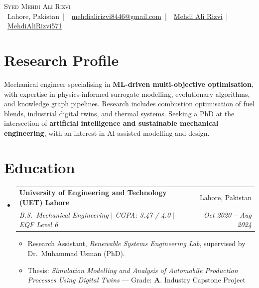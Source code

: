 \documentclass[letterpaper,11pt]{article}
\makeatletter
\newcommand{\resumeItem}[1]{
  \item\small{#1 \vspace{-2pt}}
}
\newcommand{\resumeSubheading}[4]{
  \vspace{-2pt}\item
    \begin{tabular*}{0.97\textwidth}[t]{l@{\extracolsep{\fill}}r}
      \textbf{#1} & #2 \\
      \textit{\small#3} & \textit{\small #4} \\
    \end{tabular*}\vspace{-7pt}
}
\newcommand{\resumeSubHeadingListStart}{\begin{itemize}[leftmargin=0.15in, label={}]}
\newcommand{\resumeSubHeadingListEnd}{\end{itemize}}
\newcommand{\resumeItemListStart}{\begin{itemize}}
\newcommand{\resumeItemListEnd}{\end{itemize}\vspace{-5pt}}
\makeatother
\begin{document}
\begin{center}
    {\Huge \scshape Syed Mehdi Ali Rizvi} \\ \vspace{4pt}
    \small
    \faMapMarkerAlt\ Lahore, Pakistan \,|\,  
    \faEnvelope\ \href{mailto:mehdialirizvi8446@gmail.com}{mehdialirizvi8446@gmail.com} \,|\, 
    \faLinkedin\ \href{https://linkedin.com/in/mehdi-ali-rizvi}{Mehdi Ali Rizvi} \,|\, 
    \faGithub\ \href{https://github.com/MehdiAliRizvi571}{MehdiAliRizvi571}
\end{center}

\section{Research Profile}
\vspace{2pt}
\small{
Mechanical engineer specialising in \textbf{ML-driven multi-objective optimisation}, with expertise in physics-informed surrogate modelling, evolutionary algorithms, and knowledge graph pipelines. Research includes combustion optimisation of fuel blends, industrial digital twins, and thermal systems. Seeking a PhD at the intersection of \textbf{artificial intelligence and sustainable mechanical engineering}, with an interest in AI-assisted modelling and design.
}
\vspace{2pt}

\section{Education}
\resumeSubHeadingListStart
  \resumeSubheading
    {University of Engineering and Technology (UET) Lahore}{Lahore, Pakistan}
    {B.S.\ Mechanical Engineering \quad $|$ \quad CGPA: 3.47 / 4.0 \quad $|$ \quad EQF Level 6}{Oct 2020 -- Aug 2024}
    \resumeItemListStart
      \resumeItem{Research Assistant, \textit{Renewable Systems Engineering Lab}, supervised by Dr.\ Muhammad Usman (PhD).}
      \resumeItem{Thesis: \textit{Simulation Modelling and Analysis of Automobile Production Processes Using Digital Twins} --- Grade: \textbf{A}. Industry Capstone Project}
    \resumeItemListEnd
\resumeSubHeadingListEnd

\end{document}
